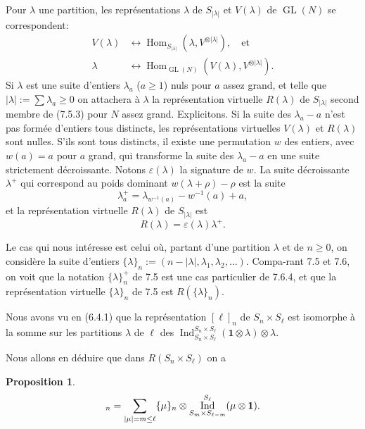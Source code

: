 \documentclass[11pt,a4paper]{article}
\theoremstyle{plain}
\newtheorem{proposition}[theorem]{Proposition}
\theoremstyle{definition}
\DeclareMathOperator{\Hom}{Hom}
\DeclareMathOperator{\Ind}{Ind}
\DeclareMathOperator{\GL}{GL}
\newcommand{\eps}{\varepsilon}
\begin{document}
Pour $\lambda$ une partition, les repr\'esentations $\lambda$ de $S_{|\lambda|}$ et $V(\lambda)$ de $\GL(N)$ se correspondent:
\begin{align}
V(\lambda) &\leftrightarrow \Hom_{S_{|\lambda|}}(\lambda, V^{\otimes |\lambda|}), \quad \text{et} \tag{7.6.1} \\
\lambda &\leftrightarrow \Hom_{\GL(N)}(V(\lambda), V^{\otimes |\lambda|}). \tag{7.6.3}
\end{align}
Si $\lambda$ est une suite d'entiers $\lambda_a$ ($a \geq 1$) nuls pour $a$ assez grand, et telle que $|\lambda| := \sum \lambda_a \geq 0$ on attachera \`a $\lambda$ la repr\'esentation virtuelle $R(\lambda)$ de $S_{|\lambda|}$ second membre de (7.5.3) pour $N$ assez grand. Explicitons. Si la suite des $\lambda_a - a$ n'est pas form\'ee d'entiers tous distincts, les repr\'esentations virtuelles $V(\lambda)$ et $R(\lambda)$ sont nulles. S'ils sont tous distincts, il existe une permutation $w$ des entiers, avec $w(a) = a$ pour $a$ grand, qui transforme la suite des $\lambda_a - a$ en une suite strictement d\'ecroissante. Notons $\eps(\lambda)$ la signature de $w$. La suite d\'ecroissante $\lambda^+$ qui correspond au poids dominant $w(\lambda + \rho) - \rho$ est la suite
\begin{equation}
\lambda^+_a = \lambda_{w^{-1}(a)} - w^{-1}(a) + a, \tag{7.6.4}
\end{equation}
et la repr\'esentation virtuelle $R(\lambda)$ de $S_{|\lambda|}$ est
\begin{equation}
R(\lambda) = \eps(\lambda) \lambda^+. \tag{7.6.5}
\end{equation}

Le cas qui nous int\'eresse est celui o\`u, partant d'une partition $\lambda$ et de $n \geq 0$, on consid\`ere la suite d'entiers $\{\lambda\}_n := (n - |\lambda|, \lambda_1, \lambda_2, \ldots)$. Compa-rant 7.5 et 7.6, on voit que la notation $\{\lambda\}^+_n$ de 7.5 est une cas particulier de 7.6.4, et que la repr\'esentation virtuelle $\{\lambda\}_n$ de 7.5 est $R(\{\lambda\}_n)$.

Nous avons vu en (6.4.1) que la repr\'esentation $[\ell]_n$ de $S_n \times S_\ell$ est isomorphe \`a la somme sur les partitions $\lambda$ de $\ell$ des $\Ind_{S_n \times S_\ell}^{S_n \times S_\ell}(\mathbf{1} \otimes \lambda) \otimes \lambda$.

Nous allons en d\'eduire que dans $R(S_n \times S_\ell)$ on a

\begin{proposition}
\begin{equation}
[\ell]_n = \sum_{|\mu| = m \leq \ell} \{\mu\}_n \otimes \Ind_{S_m \times S_{\ell-m}}^{S_\ell}(\mu \otimes \mathbf{1}). \notag
\end{equation}
\end{proposition}
\end{document}
